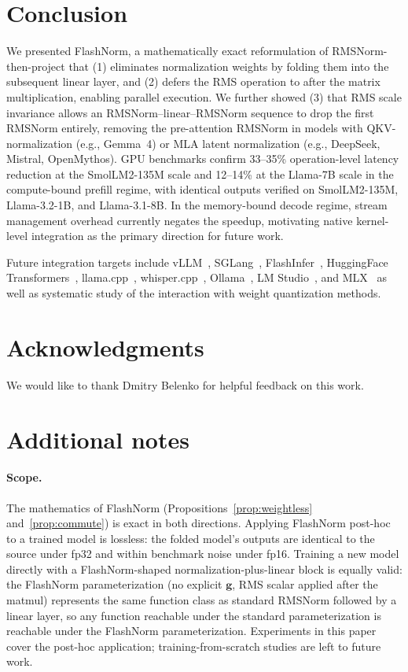 \documentclass{article}
\begin{document}
\section{Conclusion}
We presented FlashNorm, a mathematically exact reformulation of RMSNorm-then-project
that (1) eliminates normalization weights by folding them into the subsequent linear
layer, and (2) defers the RMS operation to after the matrix multiplication,
enabling parallel execution.
We further showed (3) that RMS scale invariance allows an RMSNorm--linear--RMSNorm sequence
to drop the first RMSNorm entirely, removing the pre-attention RMSNorm in models
with QKV-normalization (e.g., Gemma~4) or MLA latent normalization (e.g., DeepSeek, Mistral, OpenMythos).
GPU benchmarks confirm 33--35\% operation-level latency reduction at
the SmolLM2-135M scale and 12--14\% at the Llama-7B scale
in the compute-bound prefill regime, with identical outputs verified on
SmolLM2-135M, Llama-3.2-1B, and Llama-3.1-8B.
In the memory-bound decode regime, stream management overhead
currently negates the speedup, motivating native kernel-level integration as the
primary direction for future work.

Future integration targets include
vLLM~\citep{vLLM}, SGLang~\citep{sglang}, FlashInfer~\citep{flashInfer},
HuggingFace Transformers~\citep{HFtransformers},
llama.cpp~\citep{llama-cpp}, whisper.cpp~\citep{whisper-cpp},
Ollama~\citep{ollama}, LM Studio~\citep{lmstudio}, and MLX~\citep{mlx} as well as systematic
study of the interaction with weight quantization methods.

\section*{Acknowledgments}
We would like to thank Dmitry Belenko for helpful feedback on this work.

\appendix

\section{Additional notes}\label{app:additional-notes}

\paragraph{Scope.} The mathematics of FlashNorm (Propositions~\ref{prop:weightless} and~\ref{prop:commute}) is exact in both directions. Applying FlashNorm post-hoc to a trained model is lossless: the folded model's outputs are identical to the source under fp32 and within benchmark noise under fp16. Training a new model directly with a FlashNorm-shaped normalization-plus-linear block is equally valid: the FlashNorm parameterization (no explicit $\mathbf{g}$, RMS scalar applied after the matmul) represents the same function class as standard RMSNorm followed by a linear layer, so any function reachable under the standard parameterization is reachable under the FlashNorm parameterization. Experiments in this paper cover the post-hoc application; training-from-scratch studies are left to future work.
\end{document}
